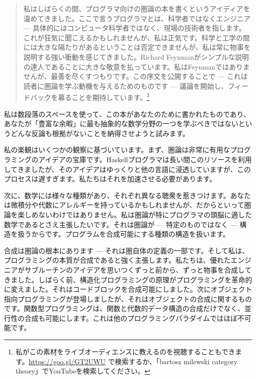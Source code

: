 
\begin{quote}
  私はしばらくの間、プログラマ向けの圏論の本を書くというアイディアを温めてきました。ここで言うプログラマとは、科学者ではなくエンジニア --- 具体的にはコンピュータ科学者ではなく、現場の技術者を指します。これが狂気に聞こえるかもしれませんが、私は正気です。科学と工学の間には大きな隔たりがあるということは否定できませんが、私は常に物事を説明する強い衝動を感じてきました。Richard Feynmanがシンプルな説明の達人であることに大きな敬意を払っています。私はFeynmanではありませんが、最善を尽くすつもりです。この序文を公開することで --- これは読者に圏論を学ぶ動機を与えるためのものです --- 議論を開始し、フィードバックを募ることを期待しています。\footnote{
    私がこの素材をライブオーディエンスに教えるのを視聴することもできます。\href{https://goo.gl/GT2UWU}{https://goo.gl/GT2UWU} で検索するか、「bartosz milewski category theory」でYouTubeを検索してください。}
\end{quote}

\lettrine[lhang=0.17]{私}{は}数段落のスペースを使って、この本があなたのために書かれたものであり、あなたが「豊富な余暇」に最も抽象的な数学分野の一つを学ぶべきではないというどんな反論も根拠がないことを納得させようと試みます。

私の楽観はいくつかの観察に基づいています。まず、圏論は非常に有用なプログラミングのアイデアの宝庫です。Haskellプログラマは長い間このリソースを利用してきましたが、そのアイデアはゆっくりと他の言語に浸透していますが、このプロセスは遅すぎます。私たちはそれを加速させる必要があります。

次に、数学には様々な種類があり、それぞれ異なる聴衆を惹きつけます。あなたは微積分や代数にアレルギーを持っているかもしれませんが、だからといって圏論を楽しめないわけではありません。私は圏論が特にプログラマの頭脳に適した数学であるとさえ主張したいです。それは圏論が --- 特定のものではなく --- 構造を扱うからです。プログラムを合成可能にする種類の構造を扱います。

合成は圏論の根本にあります --- それは圏自体の定義の一部です。そして私は、プログラミングの本質が合成であると強く主張します。私たちは、優れたエンジニアがサブルーチンのアイデアを思いつくずっと前から、ずっと物事を合成してきました。しばらく前、構造化プログラミングの原理がプログラミングを革命的に変えました。それはコードブロックを合成可能にしました。次にオブジェクト指向プログラミングが登場しましたが、それはオブジェクトの合成に関するものです。関数型プログラミングは、関数と代数的データ構造の合成だけでなく、並行性の合成も可能にします。これは他のプログラミングパラダイムではほぼ不可能です。

